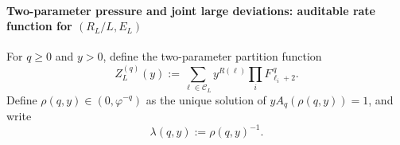 \paragraph{Two-parameter pressure and joint large deviations: auditable rate function for \texorpdfstring{$(R_L/L,E_L)$}{(R\_L/L,E\_L)}}
\begin{definition}\label{def:pom-multiplicity-composition-two-parameter-partition}
For \(q\ge 0\) and \(y>0\), define the two-parameter partition function
\[
Z_L^{(q)}(y):=\sum_{\boldsymbol{\ell}\in\mathcal{C}_L}y^{R(\boldsymbol{\ell})}\prod_i F_{\ell_i+2}^{\,q}.
\]
Define \(\rho(q,y)\in(0,\varphi^{-q})\) as the unique solution of
\(
yA_q(\rho(q,y))=1
\), and write
\[
\boxed{\;\lambda(q,y):=\rho(q,y)^{-1}.\;}
\]
\end{definition}

